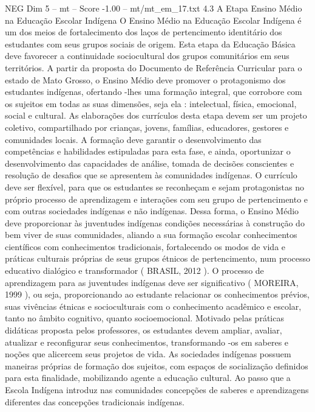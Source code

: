 \begin{textsample}{NEG Dim 5 – mt – Score -1.00 – mt/mt\_em\_17.txt}  \label{ex:f5_neg_207}
4.3 A Etapa Ensino Médio na Educação Escolar Indígena O Ensino Médio na Educação Escolar Indígena é um dos meios de fortalecimento dos laços de pertencimento identitário dos estudantes com seus grupos sociais de origem.
Esta etapa da Educação Básica deve favorecer a continuidade sociocultural dos grupos comunitários em seus territórios.
A partir da proposta do Documento de Referência Curricular para o estado de Mato Grosso, o Ensino Médio deve promover o protagonismo dos estudantes indígenas, ofertando -lhes uma formação integral, que corrobore com os sujeitos em todas as suas dimensões, seja ela : intelectual, física, emocional, social e cultural.
As elaborações dos currículos desta etapa devem ser um projeto coletivo, compartilhado por crianças, jovens, famílias, educadores, gestores e comunidades locais.
A formação deve garantir o desenvolvimento das competências e habilidades estipuladas para esta fase, e ainda, oportunizar o desenvolvimento das capacidades de análise, tomada de decisões conscientes e resolução de desafios que se apresentem às comunidades indígenas.
O currículo deve ser flexível, para que os estudantes se reconheçam e sejam protagonistas no próprio processo de aprendizagem e interações com seu grupo de pertencimento e com outras sociedades indígenas e não indígenas.
Dessa forma, o Ensino Médio deve proporcionar às juventudes indígenas condições necessárias à construção do bem viver de suas comunidades, aliando a sua formação escolar conhecimentos científicos com conhecimentos tradicionais, fortalecendo os modos de vida e práticas culturais próprias de seus grupos étnicos de pertencimento, num processo educativo dialógico e transformador ( BRASIL, 2012 ).
O processo de aprendizagem para as juventudes indígenas deve ser significativo ( MOREIRA, 1999 ), ou seja, proporcionando ao estudante relacionar os conhecimentos prévios, suas vivências étnicas e socioculturais com o conhecimento acadêmico e escolar, tanto no âmbito cognitivo, quanto socioemocional.
Motivado pelas práticas didáticas proposta pelos professores, os estudantes devem ampliar, avaliar, atualizar e reconfigurar seus conhecimentos, transformando -os em saberes e noções que alicercem seus projetos de vida.
As sociedades indígenas possuem maneiras próprias de formação dos sujeitos, com espaços de socialização definidos para esta finalidade, mobilizando agente a educação cultural.
Ao passo que a Escola Indígena introduz nas comunidades concepções de saberes e aprendizagens diferentes das concepções tradicionais indígenas.

\end{textsample}
